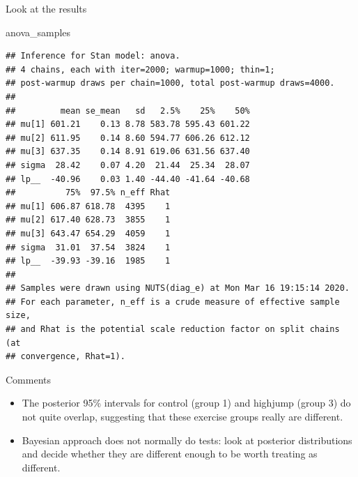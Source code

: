 \documentclass[
  ignorenonframetext,
]{beamer}
\newenvironment{Shaded}{\begin{snugshade}}{\end{snugshade}}
\newcommand{\NormalTok}[1]{#1}
\providecommand{\tightlist}{%
  \setlength{\itemsep}{0pt}\setlength{\parskip}{0pt}}
\begin{document}
\begin{frame}[fragile]{Look at the results}
\protect\hypertarget{look-at-the-results}{}

\begin{Shaded}
\begin{Highlighting}[]
\NormalTok{anova_samples}
\end{Highlighting}
\end{Shaded}

\begin{verbatim}
## Inference for Stan model: anova.
## 4 chains, each with iter=2000; warmup=1000; thin=1; 
## post-warmup draws per chain=1000, total post-warmup draws=4000.
## 
##         mean se_mean   sd   2.5%    25%    50%
## mu[1] 601.21    0.13 8.78 583.78 595.43 601.22
## mu[2] 611.95    0.14 8.60 594.77 606.26 612.12
## mu[3] 637.35    0.14 8.91 619.06 631.56 637.40
## sigma  28.42    0.07 4.20  21.44  25.34  28.07
## lp__  -40.96    0.03 1.40 -44.40 -41.64 -40.68
##          75%  97.5% n_eff Rhat
## mu[1] 606.87 618.78  4395    1
## mu[2] 617.40 628.73  3855    1
## mu[3] 643.47 654.29  4059    1
## sigma  31.01  37.54  3824    1
## lp__  -39.93 -39.16  1985    1
## 
## Samples were drawn using NUTS(diag_e) at Mon Mar 16 19:15:14 2020.
## For each parameter, n_eff is a crude measure of effective sample size,
## and Rhat is the potential scale reduction factor on split chains (at 
## convergence, Rhat=1).
\end{verbatim}

\end{frame}

\begin{frame}{Comments}
\protect\hypertarget{comments-31}{}

\begin{itemize}
\tightlist
\item
  The posterior 95\% intervals for control (group 1) and highjump (group
  3) do not quite overlap, suggesting that these exercise groups really
  are different.
\item
  Bayesian approach does not normally do tests: look at posterior
  distributions and decide whether they are different enough to be worth
  treating as different.
\end{itemize}

\end{frame}
\end{document}
